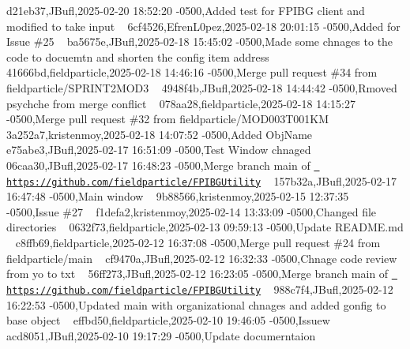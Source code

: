  d21eb37,JBufl,2025-\/02-\/20 18\+:52\+:20 -\/0500,Added test for FPIBG client and modified to take input ~\newline
 6cf4526,Efren\+L0pez,2025-\/02-\/18 20\+:01\+:15 -\/0500,Added  for Issue \#25 ~\newline
 ba5675e,JBufl,2025-\/02-\/18 15\+:45\+:02 -\/0500,Made some chnages to the code to docuemtn and shorten the config item address ~\newline
 41666bd,fieldparticle,2025-\/02-\/18 14\+:46\+:16 -\/0500,Merge pull request \#34 from fieldparticle/\+SPRINT2\+MOD3 ~\newline
 4948f4b,JBufl,2025-\/02-\/18 14\+:44\+:42 -\/0500,Rmoved psychche from merge conflict ~\newline
 078aa28,fieldparticle,2025-\/02-\/18 14\+:15\+:27 -\/0500,Merge pull request \#32 from fieldparticle/\+MOD003\+T001\+KM ~\newline
 3a252a7,kristenmoy,2025-\/02-\/18 14\+:07\+:52 -\/0500,Added Obj\+Name ~\newline
 e75abe3,JBufl,2025-\/02-\/17 16\+:51\+:09 -\/0500,Test Window chnaged ~\newline
 06caa30,JBufl,2025-\/02-\/17 16\+:48\+:23 -\/0500,Merge branch \textquotesingle{}main\textquotesingle{} of \href{https://github.com/fieldparticle/FPIBGUtility}{\texttt{ https\+://github.\+com/fieldparticle/\+FPIBGUtility}} ~\newline
 157b32a,JBufl,2025-\/02-\/17 16\+:47\+:48 -\/0500,Main window ~\newline
 9b88566,kristenmoy,2025-\/02-\/15 12\+:37\+:35 -\/0500,Issue \#27 ~\newline
 f1defa2,kristenmoy,2025-\/02-\/14 13\+:33\+:09 -\/0500,Changed file directories ~\newline
 0632f73,fieldparticle,2025-\/02-\/13 09\+:59\+:13 -\/0500,Update README.\+md ~\newline
 c8ffb69,fieldparticle,2025-\/02-\/12 16\+:37\+:08 -\/0500,Merge pull request \#24 from fieldparticle/main ~\newline
 cf9470a,JBufl,2025-\/02-\/12 16\+:32\+:33 -\/0500,Chnage code review from yo to txt ~\newline
 56ff273,JBufl,2025-\/02-\/12 16\+:23\+:05 -\/0500,Merge branch \textquotesingle{}main\textquotesingle{} of \href{https://github.com/fieldparticle/FPIBGUtility}{\texttt{ https\+://github.\+com/fieldparticle/\+FPIBGUtility}} ~\newline
 988c7f4,JBufl,2025-\/02-\/12 16\+:22\+:53 -\/0500,Updated main with organizational chnages and added gonfig to base object ~\newline
 effbd50,fieldparticle,2025-\/02-\/10 19\+:46\+:05 -\/0500,Issuew ~\newline
 acd8051,JBufl,2025-\/02-\/10 19\+:17\+:29 -\/0500,Update documerntaion ~\newline
 